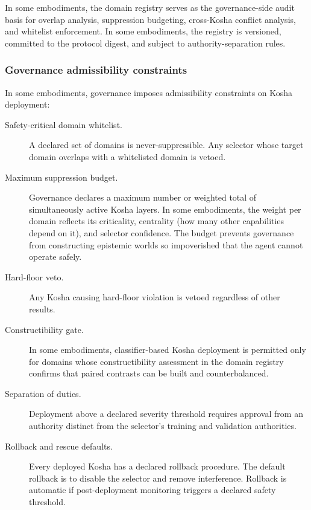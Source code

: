 \documentclass[a4paper,12pt]{article}
\begin{document}
In some embodiments, the domain registry serves as the governance-side
audit basis for overlap analysis, suppression budgeting,
cross-Kosha conflict analysis, and whitelist enforcement. In some
embodiments, the registry is versioned, committed to the protocol
digest, and subject to authority-separation rules.

\subsubsection{Governance admissibility constraints}
\label{sec:kosha-admissibility}

In some embodiments, governance imposes admissibility constraints on
Kosha deployment:

\begin{description}
  \item[Safety-critical domain whitelist.] A declared set of domains
    is never-suppressible. Any selector whose target domain overlaps
    with a whitelisted domain is vetoed.
  \item[Maximum suppression budget.] Governance declares a maximum
    number or weighted total of simultaneously active Kosha layers.
    In some embodiments, the weight per domain reflects its
    criticality, centrality (how many other capabilities depend on
    it), and selector confidence. The budget prevents governance from
    constructing epistemic worlds so impoverished that the agent
    cannot operate safely.
  \item[Hard-floor veto.] Any Kosha causing hard-floor violation is
    vetoed regardless of other results.
  \item[Constructibility gate.] In some embodiments, classifier-based
    Kosha deployment is permitted only for domains whose
    constructibility assessment in the domain registry confirms that
    paired contrasts can be built and counterbalanced.
  \item[Separation of duties.] Deployment above a declared severity
    threshold requires approval from an authority distinct from the
    selector's training and validation authorities.
  \item[Rollback and rescue defaults.] Every deployed Kosha has a
    declared rollback procedure. The default rollback is to disable
    the selector and remove interference. Rollback is automatic if
    post-deployment monitoring triggers a declared safety threshold.
\end{description}
\end{document}
